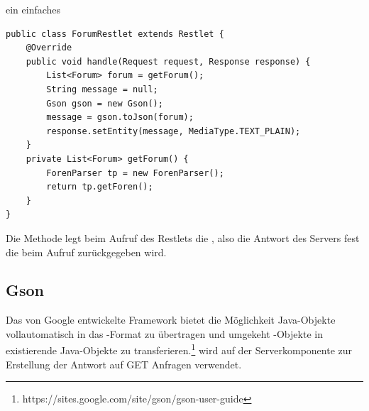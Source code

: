 ein einfaches 
\begin{lstlisting}[caption=Ein einfaches Restlet, label=restlet]
public class ForumRestlet extends Restlet {
	@Override
    public void handle(Request request, Response response) {
		List<Forum> forum = getForum();
        String message = null;
        Gson gson = new Gson();
        message = gson.toJson(forum);
        response.setEntity(message, MediaType.TEXT_PLAIN);
    }
	private List<Forum> getForum() {
		ForenParser tp = new ForenParser();
		return tp.getForen();
	}
}
\end{lstlisting}
Die Methode  legt beim Aufruf
des Restlets die , also die Antwort des Servers fest die
beim Aufruf zurückgegeben wird.
\subsection{Gson}
Das von Google entwickelte Framework  bietet die Möglichkeit
Java-Objekte vollautomatisch in das -Format zu übertragen und
umgekeht -Objekte in existierende Java-Objekte zu
transferieren.\footnote{https://sites.google.com/site/gson/gson-user-guide} 
 wird auf der Serverkomponente zur Erstellung der Antwort auf
GET Anfragen verwendet. 
